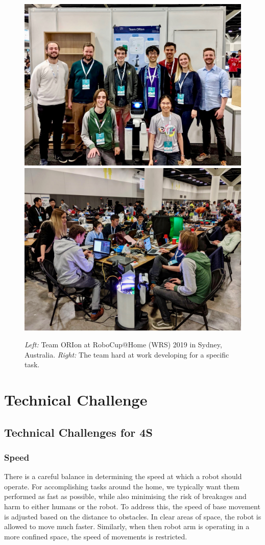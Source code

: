 \documentclass[runningheads,a4paper]{llncs}
\begin{document}
\begin{figure}[tb]
  \begin{center}
    \includegraphics[width=.48\columnwidth, clip, trim=0 0ex 0ex 50ex]{images/robocup_team.jpg}
    \includegraphics[width=.45\columnwidth, clip, trim=0 0ex 0ex 50ex]{images/robocup_team_working.jpg}
  \end{center} 
  \caption{\emph{Left:} Team ORIon at RoboCup@Home (WRS) 2019 in Sydney, Australia. \emph{Right:} The team hard at work developing for a specific task.}
  \label{fig:robocup}
\end{figure}

\section{Technical Challenge}
\subsection{Technical Challenges for 4S}
\subsubsection{Speed}
There is a careful balance in determining the speed at which a robot should operate. For accomplishing tasks around the home, we typically want them performed as fast as possible, while also minimising the risk of breakages and harm to either humans or the robot. To address this, the speed of base movement is adjusted based on the distance to obstacles. In clear areas of space, the robot is allowed to move much faster. Similarly, when then robot arm is operating in a more confined space, the speed of movements is restricted.
\end{document}
